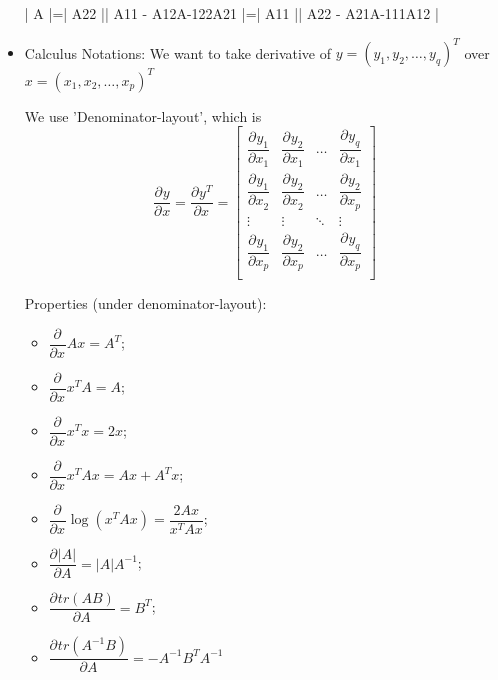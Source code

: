 \begin{itemize}[topsep=6pt,itemsep=4pt]
        
        | A |=| A22 || A11 - A12A-122A21 |=| A11 || A22 - A21A-111A12 |
                
            
                       
        \item Calculus Notations: We want to take derivative of $ y=(y_1,y_2,\ldots,y_q)^T $ over $ x=(x_1,x_2,\ldots,x_p)^T $
        
        We use 'Denominator-layout', which is
        \begin{equation}
            \dfrac{\partial^{}y }{\partial ^{}x}=\dfrac{\partial^{} y^T}{\partial x^{}} =
            \begin{bmatrix}
            \dfrac{\partial^{} y_1}{\partial x_1 ^{}}&\dfrac{\partial^{} y_2}{\partial x_1 ^{}}&\ldots&\dfrac{\partial^{} y_q}{\partial x_1 ^{}}\\
            \dfrac{\partial^{} y_1}{\partial x_2 ^{}}&\dfrac{\partial^{} y_2}{\partial x_2 ^{}}&\ldots&\dfrac{\partial^{} y_2}{\partial x_p ^{}}\\
            \vdots&\vdots&\ddots&\vdots\\
            \dfrac{\partial^{} y_1}{\partial x_p ^{}}&\dfrac{\partial^{} y_2}{\partial x_p ^{}}&\ldots&\dfrac{\partial^{} y_q}{\partial x_p ^{}}\\
            \end{bmatrix}
        \end{equation}
        
        \hypertarget{MatrixDifferenciation}{Properties (under denominator-layout):}
        \begin{itemize}[topsep=6pt,itemsep=2.5pt]
            \item $ \dfrac{\partial^{} }{\partial x^{}}Ax=A^T $;\\
            \item $ \dfrac{\partial^{} }{\partial x^{}}x^TA=A $;\\
            \item $ \dfrac{\partial^{} }{\partial x^{}}x^Tx=2x $;\\
            \item $ \dfrac{\partial^{} }{\partial x^{}}x^TAx=Ax+A^Tx $;\\
            \item $ \dfrac{\partial^{} }{\partial x^{}}\log(x^TAx)=\dfrac{2Ax}{x^TAx} $;\\
            \item $ \dfrac{\partial^{} |A|}{\partial A^{}}=|A|A^{-1} $;\\
            \item $ \dfrac{\partial^{} tr(AB)}{\partial A^{}}=B^T $;\\
            \item $ \dfrac{\partial^{} tr(A^{-1}B)}{\partial A^{}}=-A^{-1}B^TA^{-1} $
        \end{itemize}
          

\end{itemize}
